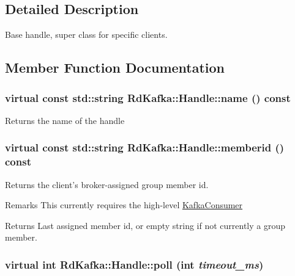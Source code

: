 \subsection{Detailed Description}
Base handle, super class for specific clients. 

\subsection{Member Function Documentation}
\hypertarget{classRdKafka_1_1Handle_abaa74be1b5b15784d47bc9c97edd0b9c}{
\subsubsection[{name}]{\setlength{\rightskip}{0pt plus 5cm}virtual const std::string RdKafka::Handle::name () const}}
\label{classRdKafka_1_1Handle_abaa74be1b5b15784d47bc9c97edd0b9c}
\begin{DoxyReturn}{Returns}
the name of the handle 
\end{DoxyReturn}
\hypertarget{classRdKafka_1_1Handle_ae0395b131921c05554688202fc0160a4}{
\subsubsection[{memberid}]{\setlength{\rightskip}{0pt plus 5cm}virtual const std::string RdKafka::Handle::memberid () const}}
\label{classRdKafka_1_1Handle_ae0395b131921c05554688202fc0160a4}


Returns the client's broker-\/assigned group member id. \begin{DoxyRemark}{Remarks}
This currently requires the high-\/level \hyperlink{classRdKafka_1_1KafkaConsumer}{KafkaConsumer}
\end{DoxyRemark}
\begin{DoxyReturn}{Returns}
Last assigned member id, or empty string if not currently a group member. 
\end{DoxyReturn}
\hypertarget{classRdKafka_1_1Handle_a98d3b4ee48457ff13e4d5155e3fc5ea4}{
\subsubsection[{poll}]{\setlength{\rightskip}{0pt plus 5cm}virtual int RdKafka::Handle::poll (int {\em timeout\_\-ms})}}
\label{classRdKafka_1_1Handle_a98d3b4ee48457ff13e4d5155e3fc5ea4}


